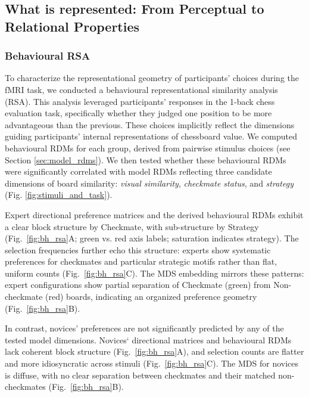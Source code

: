 \documentclass[preprint,12pt]{elsarticle}
\begin{document}
\subsection{What is represented: From Perceptual to Relational Properties}

\subsubsection{Behavioural RSA}
To characterize the representational geometry of participants' choices during the fMRI task, we conducted a behavioural representational similarity analysis (RSA). This analysis leveraged participants' responses in the 1-back chess evaluation task, specifically whether they judged one position to be more advantageous than the previous. These choices implicitly reflect the dimensions guiding participants' internal representations of chessboard value. We computed behavioural RDMs for each group, derived from pairwise stimulus choices (see Section \ref{sec:model_rdms}). We then tested whether these behavioural RDMs were significantly correlated with model RDMs reflecting three candidate dimensions of board similarity: \emph{visual similarity}, \emph{checkmate status}, and \emph{strategy} (Fig. \ref{fig:stimuli_and_task}). 

Expert directional preference matrices and the derived behavioural RDMs exhibit a clear block structure by Checkmate, with sub-structure by Strategy (Fig.~\ref{fig:bh_rsa}A; green vs. red axis labels; saturation indicates strategy). The selection frequencies further echo this structure: experts show systematic preferences for checkmates and particular strategic motifs rather than flat, uniform counts (Fig.~\ref{fig:bh_rsa}C). The MDS embedding mirrors these patterns: expert configurations show partial separation of Checkmate (green) from Non-checkmate (red) boards, indicating an organized preference geometry (Fig.~\ref{fig:bh_rsa}B).

In contrast, novices' preferences are not significantly predicted by any of the tested model dimensions. Novices‘ directional matrices and behavioural RDMs lack coherent block structure (Fig.~\ref{fig:bh_rsa}A), and selection counts are flatter and more idiosyncratic across stimuli (Fig.~\ref{fig:bh_rsa}C). The MDS for novices is diffuse, with no clear separation between checkmates and their matched non-checkmates (Fig.~\ref{fig:bh_rsa}B).
\end{document}

